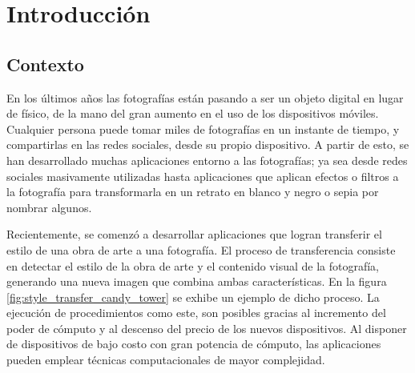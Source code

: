 \documentclass[a4paper,11pt,spanish]{book}
\begin{document}

\tableofcontents

\chapter{Introducción}
  \section {Contexto}
    En los últimos años las fotografías están pasando a ser un objeto digital en lugar de físico, de la mano del gran aumento en el uso de los dispositivos móviles.
    Cualquier persona puede tomar miles de fotografías en un instante de tiempo, y compartirlas en las redes sociales, desde su propio dispositivo.
    A partir de esto, se han desarrollado muchas aplicaciones entorno a las fotografías; ya sea desde redes sociales masivamente utilizadas hasta aplicaciones que aplican 
    efectos o filtros a la fotografía para transformarla en un retrato en blanco y negro o sepia por nombrar algunos.

    Recientemente, se comenzó a desarrollar aplicaciones que logran transferir el estilo de una obra de arte a una fotografía.
    El proceso de transferencia consiste en detectar el estilo de la obra de arte y el contenido visual de la fotografía, generando una nueva imagen que combina 
    ambas características. En la figura \ref{fig:style_transfer_candy_tower} se exhibe un ejemplo de dicho proceso.
    La ejecución de procedimientos como este, son posibles gracias al incremento del poder de cómputo y al descenso del precio de los nuevos dispositivos. 
    Al disponer de dispositivos de bajo costo con gran potencia de cómputo, las aplicaciones pueden emplear técnicas computacionales de mayor complejidad.
\end{document}
